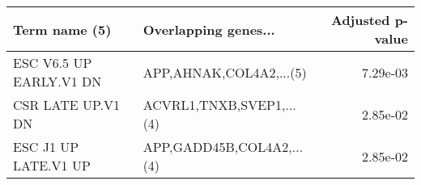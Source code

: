\begin{tabular}{llr}
\toprule
          Term name (5) &      Overlapping genes... &  Adjusted p-value \\
\midrule
ESC V6.5 UP EARLY.V1 DN &   APP,AHNAK,COL4A2,...(5) &          7.29e-03 \\
      CSR LATE UP.V1 DN &  ACVRL1,TNXB,SVEP1,...(4) &          2.85e-02 \\
   ESC J1 UP LATE.V1 UP & APP,GADD45B,COL4A2,...(4) &          2.85e-02 \\
\bottomrule
\end{tabular}
